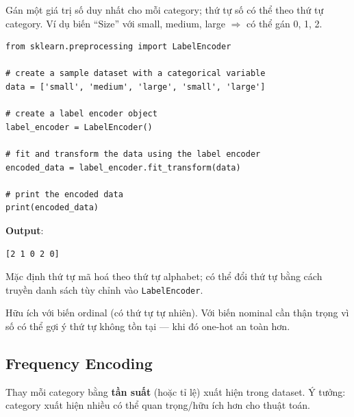 \begin{dinhnghia}[title={Label encoding}]
Gán một giá trị số duy nhất cho mỗi category; thứ tự số có thể theo thứ tự category.
Ví dụ biến ``Size'' với small, medium, large $\Rightarrow$ có thể gán 0, 1, 2.
\end{dinhnghia}

\begin{vidu}[title={Ví dụ Label Encoding với scikit-learn}]
\begin{lstlisting}
from sklearn.preprocessing import LabelEncoder

# create a sample dataset with a categorical variable
data = ['small', 'medium', 'large', 'small', 'large']

# create a label encoder object
label_encoder = LabelEncoder()

# fit and transform the data using the label encoder
encoded_data = label_encoder.fit_transform(data)

# print the encoded data
print(encoded_data)
\end{lstlisting}

\textbf{Output}:
\begin{lstlisting}
[2 1 0 2 0]
\end{lstlisting}
Mặc định thứ tự mã hoá theo thứ tự alphabet; có thể đổi thứ tự bằng cách truyền danh sách tùy chỉnh vào \texttt{LabelEncoder}.
\end{vidu}

\begin{luuy}[title={Khi nào dùng label encoding}]
Hữu ích với biến ordinal (có thứ tự tự nhiên).
Với biến nominal cần thận trọng vì số có thể gợi ý thứ tự không tồn tại --- khi đó one-hot an toàn hơn.
\end{luuy}

\subsection{Frequency Encoding}

\begin{dinhnghia}[title={Frequency encoding}]
Thay mỗi category bằng \textbf{tần suất} (hoặc tỉ lệ) xuất hiện trong dataset.
Ý tưởng: category xuất hiện nhiều có thể quan trọng/hữu ích hơn cho thuật toán.
\end{dinhnghia}

